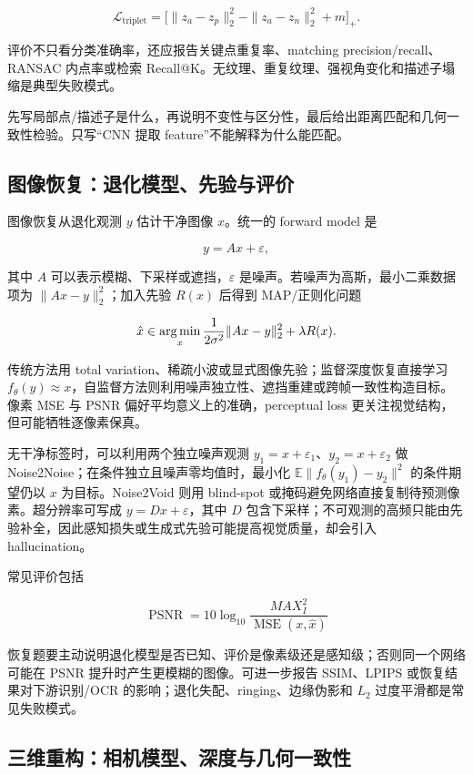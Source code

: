 \documentclass[11pt]{ctexart}
\begin{document}
\[
  \mathcal L_{\mathrm{triplet}}
  =\bigl[\|z_a-z_p\|_2^2-\|z_a-z_n\|_2^2+m\bigr]_+.
\]

评价不只看分类准确率，还应报告关键点重复率、matching precision/recall、RANSAC 内点率或检索 Recall@K。无纹理、重复纹理、强视角变化和描述子塌缩是典型失败模式。

\begin{examnote}[特征题答题骨架]
先写局部点/描述子是什么，再说明不变性与区分性，最后给出距离匹配和几何一致性检验。只写“CNN 提取 feature”不能解释为什么能匹配。
\end{examnote}

\subsection{图像恢复：退化模型、先验与评价}

图像恢复从退化观测 \(y\) 估计干净图像 \(x\)。统一的 forward model 是

\[
  y=Ax+\varepsilon,
\]

其中 \(A\) 可以表示模糊、下采样或遮挡，\(\varepsilon\) 是噪声。若噪声为高斯，最小二乘数据项为 \(\|Ax-y\|_2^2\)；加入先验 \(R(x)\) 后得到 MAP/正则化问题

\[
  \hat x
  \in
  \operatorname*{arg\,min}_x
  \frac{1}{2\sigma^2}\|Ax-y\|_2^2+\lambda R(x).
\]

传统方法用 total variation、稀疏小波或显式图像先验；监督深度恢复直接学习 \(f_\theta(y)\approx x\)，自监督方法则利用噪声独立性、遮挡重建或跨帧一致性构造目标。像素 MSE 与 PSNR 偏好平均意义上的准确，perceptual loss 更关注视觉结构，但可能牺牲逐像素保真。

无干净标签时，可以利用两个独立噪声观测 \(y_1=x+\varepsilon_1\)、\(y_2=x+\varepsilon_2\) 做 Noise2Noise；在条件独立且噪声零均值时，最小化 \(\mathbb E\|f_\theta(y_1)-y_2\|^2\) 的条件期望仍以 \(x\) 为目标。Noise2Void 则用 blind-spot 或掩码避免网络直接复制待预测像素。超分辨率可写成 \(y=Dx+\varepsilon\)，其中 \(D\) 包含下采样；不可观测的高频只能由先验补全，因此感知损失或生成式先验可能提高视觉质量，却会引入 hallucination。

常见评价包括

\[
  \operatorname{PSNR}=10\log_{10}\frac{MAX_I^2}{\operatorname{MSE}(x,\hat x)}
\]

恢复题要主动说明退化模型是否已知、评价是像素级还是感知级；否则同一个网络可能在 PSNR 提升时产生更模糊的图像。可进一步报告 SSIM、LPIPS 或恢复结果对下游识别/OCR 的影响；退化失配、ringing、边缘伪影和 \(L_2\) 过度平滑都是常见失败模式。

\subsection{三维重构：相机模型、深度与几何一致性}
\end{document}
